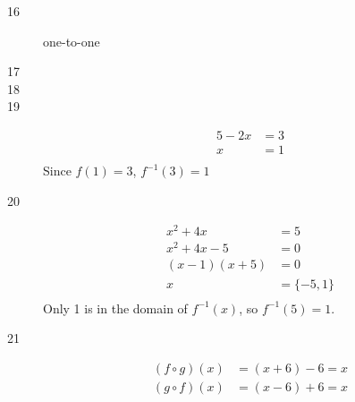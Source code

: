 \documentclass{exam}
\begin{document}
\begin{description}
    \item[16] one-to-one

\pagebreak

    \item[17] 

    \item[18] 

    \item[19] 
      \begin{align*}
        5 - 2x &= 3 \\
        x      &= 1 \\
      \end{align*}
      Since $f(1) = 3$, $f^{-1}(3) = 1$

    \item[20] 
      \begin{align*}
        x^2 + 4x       &= 5 \\
        x^2 + 4x - 5   &= 0 \\
        (x - 1)(x + 5) &= 0 \\
        x              &= \{-5, 1\} \\
      \end{align*}
      Only 1 is in the domain of $f^{-1}(x)$, so $f^{-1}(5) = 1$.

    \item[21]
      \begin{align*}
        (f \circ g)(x) &= (x + 6) - 6 = x \\
        (g \circ f)(x) &= (x - 6) + 6 = x \\
      \end{align*}


\end{description}
\end{document}
